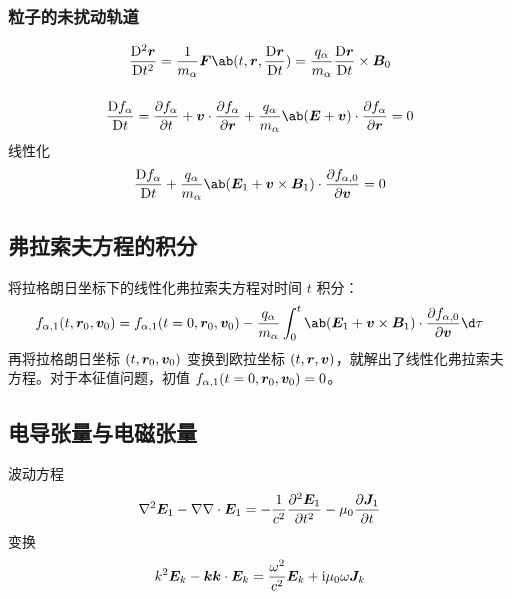 \subsubsection{粒子的未扰动轨道}

\begin{equation}
\mdv[2]{\vector{r}}{t} = \frac{1}{m_\alpha} \vector{F}\ab(t, \vector{r}, \mdv{\vector{r}}{t})
= \frac{q_\alpha}{m_\alpha} \mdv{\vector{r}}{t} \times \vector{B}_0
\end{equation}

\subsubsection{}

\begin{equation}
\mdv{f_\alpha}{t} = \pdv{f_\alpha}{t}
+ \vector{v} \cdot \pdv{f_\alpha}{\vector{r}}
+ \frac{q_\alpha}{m_\alpha} \ab(\vector{E} + \vector{v} \textbf{}) \cdot \pdv{f_\alpha}{\vector{r}}
= 0
\end{equation}
线性化
\begin{equation}
\mdv{f_\alpha}{t}
+ \frac{q_\alpha}{m_\alpha}
\ab(\vector{E}_1 + \vector{v} \times \vector{B}_1)
\cdot \pdv{f_{\alpha, 0}}{\vector{v}}
= 0
\end{equation}

\subsection{弗拉索夫方程的积分}

将拉格朗日坐标下的线性化弗拉索夫方程对时间 $t$ 积分：
\begin{equation}
f_{\alpha,1}(t, \vector{r}_0, \vector{v}_0)
= f_{\alpha,1}(t=0, \vector{r}_0, \vector{v}_0)
- \frac{q_\alpha}{m_\alpha} \int_0^t
    \ab(\vector{E}_1 + \vector{v} \times \vector{B}_1)
    \cdot \pdv{f_{\alpha, 0}}{\vector{v}}
\d\tau
\end{equation}
再将拉格朗日坐标 $(t, \bm{r}_0, \bm{v}_0)$ 变换到欧拉坐标 $(t, \bm{r}, \bm{v})$，就解出了线性化弗拉索夫方程。对于本征值问题，初值 $f_{\alpha,1}(t=0, \bm{r}_0, \bm{v}_0) = 0$。

\subsection{电导张量与电磁张量}

波动方程
\begin{equation}
\nabla^2 {\bm{E}_1} - \nabla {\nabla \cdot {\bm{E}_1}}
= - \frac{1}{c^2} \pdv[2]{\bm{E}_1}{t} - \mu_0 \pdv{\bm{J}_1}{t}
\end{equation}
变换
\begin{equation}
k^2 \bm{E}_k - \bm{k}\bm{k} \cdot \bm{E}_k
= \frac{\omega^2}{c^2} \bm{E}_k + \mathrm{i} \mu_0 \omega \bm{J}_k
\end{equation}

